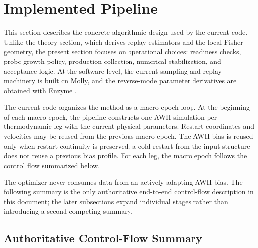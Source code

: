 \section{Implemented Pipeline}

This section describes the concrete algorithmic design used by the current code. Unlike the theory section, which derives replay estimators and the local Fisher geometry, the present section focuses on operational choices: readiness checks, probe growth policy, production collection, numerical stabilization, and acceptance logic. At the software level, the current sampling and replay machinery is built on Molly, and the reverse-mode parameter derivatives are obtained with Enzyme \citep{greener2024molly,moses2020enzyme}.

The current code organizes the method as a macro-epoch loop. At the beginning of each macro epoch, the pipeline constructs one AWH simulation per thermodynamic leg with the current physical parameters. Restart coordinates and velocities may be reused from the previous macro epoch. The AWH bias is reused only when restart continuity is preserved; a cold restart from the input structure does not reuse a previous bias profile. For each leg, the macro epoch follows the control flow summarized below.

The optimizer never consumes data from an actively adapting AWH bias. The following summary is the only authoritative end-to-end control-flow description in this document; the later subsections expand individual stages rather than introducing a second competing summary.

\subsection{Authoritative Control-Flow Summary}
\label{sec:authoritative_control_flow}

